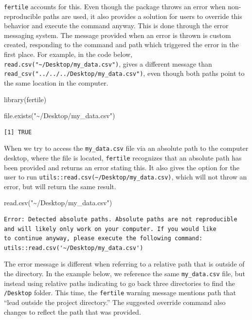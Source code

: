 \documentclass[12pt,twoside]{reedthesis}
\newenvironment{Shaded}{\begin{snugshade}}{\end{snugshade}}
\newcommand{\FunctionTok}[1]{\textcolor[rgb]{0.00,0.00,0.00}{#1}}
\newcommand{\NormalTok}[1]{#1}
\newcommand{\StringTok}[1]{\textcolor[rgb]{0.31,0.60,0.02}{#1}}
\begin{document}
\texttt{fertile} accounts for this. Even though the package throws an error when non-reproducible paths are used, it also provides a solution for users to override this behavior and execute the command anyway. This is done through the error messaging system. The message provided when an error is thrown is custom created, responding to the command and path which triggered the error in the first place. For example, in the code below, \texttt{read.csv("\textasciitilde{}/Desktop/my\_data.csv")}, gives a different message than \texttt{read\_csv("../../../Desktop/my\_data.csv")}, even though both paths point to the same location in the computer.
\begin{Shaded}
\begin{Highlighting}[]
\FunctionTok{library}\NormalTok{(fertile)}
\end{Highlighting}
\end{Shaded}
\begin{Shaded}
\begin{Highlighting}[]
\FunctionTok{file.exists}\NormalTok{(}\StringTok{"\textasciitilde{}/Desktop/my\_data.csv"}\NormalTok{)}
\end{Highlighting}
\end{Shaded}
\begin{verbatim}
[1] TRUE
\end{verbatim}
When we try to access the \texttt{my\_data.csv} file via an absolute path to the computer desktop, where the file is located, \texttt{fertile} recognizes that an absolute path has been provided and returns an error stating this. It also gives the option for the user to run \texttt{utils::read.csv(\textquotesingle{}\textasciitilde{}/Desktop/my\_data.csv\textquotesingle{})}, which will not throw an error, but will return the same result.
\begin{Shaded}
\begin{Highlighting}[]
\FunctionTok{read.csv}\NormalTok{(}\StringTok{"\textasciitilde{}/Desktop/my\_data.csv"}\NormalTok{)}
\end{Highlighting}
\end{Shaded}
\begin{verbatim}
Error: Detected absolute paths. Absolute paths are not reproducible
and will likely only work on your computer. If you would like
to continue anyway, please execute the following command:
utils::read.csv('~/Desktop/my_data.csv')
\end{verbatim}
The error message is different when referring to a relative path that is outside of the directory. In the example below, we reference the same \texttt{my\_data.csv} file, but instead using relative paths indicating to go back three directories to find the \texttt{/Desktop} folder. This time, the \texttt{fertile} warning message mentions path that ``lead outside the project directory.'' The suggested override command also changes to reflect the path that was provided.
\end{document}
